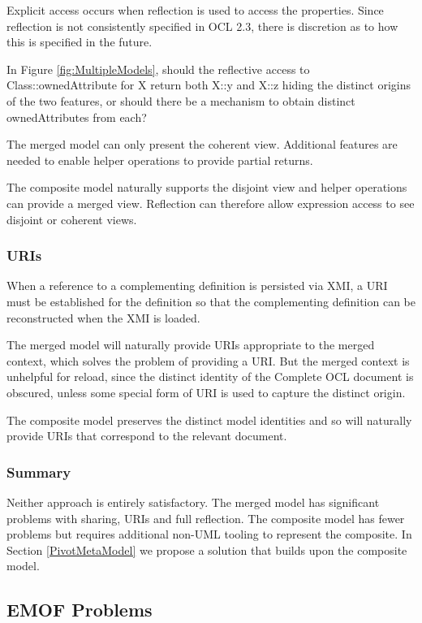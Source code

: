 \documentclass{eceasst}
\begin{document}
Explicit access occurs when reflection is used to access the properties. Since reflection is not consistently specified in OCL 2.3, there is discretion as to how this is specified in the future.

In Figure \ref{fig:MultipleModels}, should the reflective access to Class::ownedAttribute for X return both X::y and X::z hiding the distinct origins of the two features, or should there be a mechanism to obtain distinct ownedAttributes from each?

The merged model can only present the coherent view. Additional features are needed to enable helper operations to provide partial returns.

The composite model naturally supports the disjoint view and helper operations can provide a merged view. Reflection can therefore allow expression access to see disjoint or coherent views.

\subsubsection{URIs}

When a reference to a complementing definition is persisted via XMI, a URI must be established for the definition so that the complementing definition can be reconstructed when the XMI is loaded.

The merged model will naturally provide URIs appropriate to the merged context, which solves the problem of providing a URI. But the merged context is unhelpful for reload, since the distinct identity of the Complete OCL document is obscured, unless some special form of URI is used to capture the distinct origin.

The composite model preserves the distinct model identities and so will naturally provide URIs that correspond to the relevant document.

\subsubsection{Summary}

Neither approach is entirely satisfactory. The merged model has significant problems with sharing, URIs and full reflection. The composite model has fewer problems but requires additional non-UML tooling to represent the composite. In Section \ref{PivotMetaModel} we propose a solution that builds upon the composite model.

\subsection{EMOF Problems}\label{EMOF}
\end{document}
